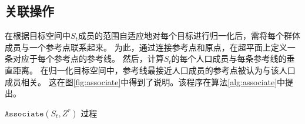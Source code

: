 \subsection{关联操作}
在根据目标空间中$S_t$成员的范围自适应地对每个目标进行归一化后，需将每个群体成员与一个参考点联系起来。%
为此，通过连接参考点和原点，在超平面上定义一条对应于每个参考点的参考线。%
然后，计算$S_t$的每个人口成员与每条参考线的垂直距离。%
在归一化目标空间中，参考线最接近人口成员的参考点被认为与该人口成员相关。%
这在图\ref{fig:associate}中得到了说明。该程序在算法\ref{alg:associate}中提出。
\begin{algorithm}
    \caption{$\mathtt{Associate}(S_t,Z^r)$ 过程}\label{alg:associate}
\end{algorithm}
